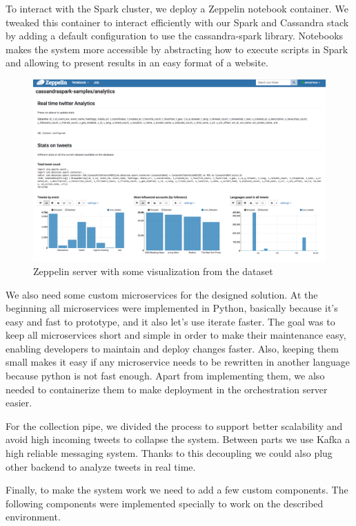 To interact with the Spark cluster, we deploy a Zeppelin notebook container. We tweaked this container to interact efficiently with our Spark and Cassandra stack by adding a default configuration to use the cassandra-spark library. Notebooks makes the system more accessible by abstracting how to execute scripts in Spark and allowing to present results in an easy format of a website.

\begin{figure}
\centering
\includegraphics[width=\textwidth]{Figures/zeppelin}
\decoRule
\caption[Zeppelin visualization example]{Zeppelin server with some visualization from the dataset}
\label{fig:zeppelin}
\end{figure}

We also need some custom microservices for the designed solution. At the beginning all microservices were implemented in Python, basically because it’s easy and fast to prototype, and it also let’s use iterate faster. The goal was to keep all microservices short and simple in order to make their maintenance easy, enabling developers to maintain and deploy changes faster. Also, keeping them small makes it easy if any microservice needs to be rewritten in another language because python is not fast enough. Apart from implementing them, we also needed to containerize them to make deployment in the orchestration server easier. 


For the collection pipe, we divided the process to support better scalability and avoid high incoming tweets to collapse the system. Between parts we use Kafka a high reliable messaging system. Thanks to this decoupling we could also plug other backend to analyze tweets in real time. 

Finally, to make the system work we need to add a few custom components. The following components were implemented specially to work on the described environment. 

